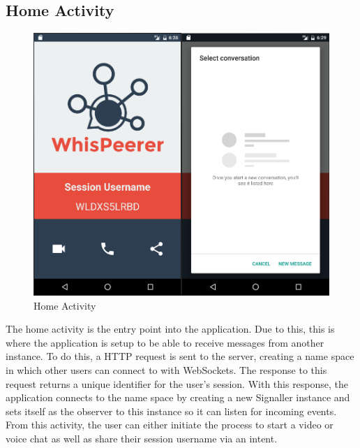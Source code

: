 \documentclass[]{report}
\begin{document}
		\subsection{Home Activity}
			\begin{figure}[H]
				\caption{Home Activity}
				\centering
				\includegraphics[scale=0.35]{HomeActivity.png}
			\end{figure}		
		The home activity is the entry point into the application. Due to this, this is where the application is setup to be able to receive messages from another instance. To do this, a HTTP request is sent to the server, creating a name space in which other users can connect to with WebSockets. The response to this request returns a unique identifier for the user's session. With this response, the application connects to the name space by creating a new Signaller instance and sets itself as the observer to this instance so it can listen for incoming events. From this activity, the user can either initiate the process to start a video or voice chat as well as share their session username via an intent.
\end{document}

